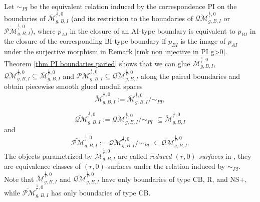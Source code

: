 \documentclass[11pt]{amsart}
\theoremstyle{definition}
\theoremstyle{remark}
\newcommand{\oPMb}{{\overline{\mathcal{PM}}}}
\newcommand{\oQMb}{{\overline{\mathcal{QM}}}}
\newcommand{\<}{\left<}
\renewcommand{\>}{\right>}
\numberwithin{equation}{section}
\def\Mbar{{\overline{\mathcal M}}}
\def\PI{{\text{PI}}}
\def\PI{\text{PI}}
\begin{document}
  Let $\sim_{PI}$ be the equivalent relation induced by the correspondence $\PI$ on the boundaries of $\Mbar^{\frac{1}{r},0}_{g,B,I}$ (and its restriction to the boundaries of $\oQMb^{\frac{1}{r},0}_{g,B,I}$ or $\oPMb^{\frac{1}{r},0}_{g,B,I}$), where $p_{AI}$ in the closure of an AI-type boundary is equivalent to $p_{BI}$ in the closure of the corresponding BI-type boundary if $p_{BI}$ is the image of $p_{AI}$ under the surjective morphism in Remark \ref{rmk non injective in PI g>0}. Theorem \ref{thm  PI boundaries paried} shows that we can glue $\Mbar^{\frac{1}{r},0}_{g,B,I}$, $\oQMb^{\frac{1}{r},0}_{g,B,I}\subseteq \Mbar^{\frac{1}{r},0}_{g,B,I}$ and $\oPMb^{\frac{1}{r},0}_{g,B,I}\subseteq \oQMb^{\frac{1}{r},0}_{g,B,I}$ along the paired boundaries and obtain piecewise smooth glued moduli spaces
    $$
    \widetilde{\mathcal M}^{\frac{1}{r},0}_{g,B,I}:=\Mbar^{\frac{1}{r},0}_{g,B,I}\big/\sim_{PI},
    $$
    
    $$
    \widetilde{\mathcal{QM}}^{\frac{1}{r},0}_{g,B,I}:=\overline{\mathcal{QM}}^{\frac{1}{r},0}_{g,B,I}\big/\sim_{PI} \,\, \subseteq \widetilde{\mathcal M}^{\frac{1}{r},0}_{g,B,I}
    $$
    and
    $$
     \widetilde{\mathcal{PM}}^{\frac{1}{r},0}_{g,B,I}:=\overline{\mathcal{QM}}^{\frac{1}{r},0}_{g,B,I}\big/\sim_{PI} \,\,\subseteq \widetilde{\mathcal{QM}}^{\frac{1}{r},0}_{g,B,I}.
    $$
    The objects parametrized by $\widetilde{\mathcal M}^{\frac{1}{r},0}_{g,B,I}$  are called \textit{reduced $(r,0)$-surfaces} in \cite{TZ1}, they are equivalence classes of $(r,0)$-surfaces under the relation induced by $\sim_{PI}$. Note that $\widetilde{\mathcal M}^{\frac{1}{r},0}_{g,B,I}$ and $\widetilde{\mathcal {QM}}^{\frac{1}{r},0}_{g,B,I}$ have only boundaries of type CB, R, and NS+, while $\widetilde{\mathcal {PM}}^{\frac{1}{r},0}_{g,B,I}$ has only boundaries of type CB.
    
\end{document}
